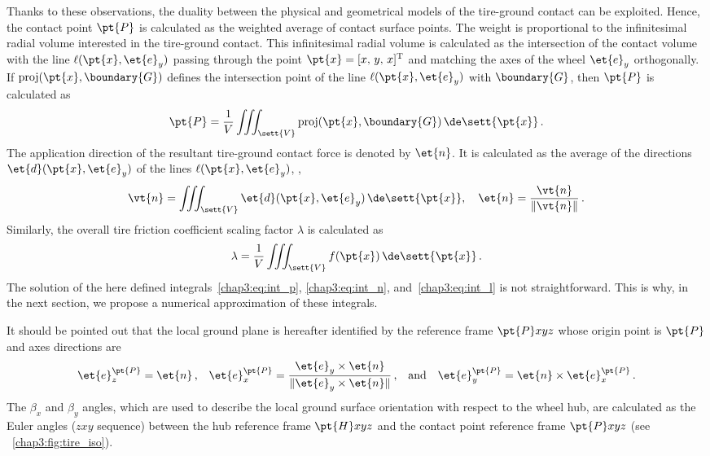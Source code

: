 Thanks to these observations, the duality between the physical and geometrical models of the tire-ground contact can be exploited. Hence, the contact point $\pt{P}$ is calculated as the weighted average of contact surface points. The weight is proportional to the infinitesimal radial volume interested in the tire-ground contact. This infinitesimal radial volume is calculated as the intersection of the contact volume with the line $\ell(\pt{x},\et{e}_y)$ passing through the point $\pt{x} = [x, \, y, \, x]^\mathrm{T}$ and matching the axes of the wheel $\et{e}_y$ orthogonally. If $\mathrm{proj}(\pt{x},\boundary{G})$ defines the intersection point of the line $\ell(\pt{x},\et{e}_y)$ with $\boundary{G}$, then $\pt{P}$ is calculated as
%
\begin{equation}
  \pt{P} = \dfrac{1}{V} \displaystyle\iiint_\sett{V} \mathrm{proj}(\pt{x},\boundary{G}) \, \de\sett{\pt{x}}
  \,\text{.}
  \label{chap3:eq:int_p}
\end{equation}
%
The application direction of the resultant tire-ground contact force is denoted by $\et{n}$. It is calculated as the average of the directions $\et{d}(\pt{x},\et{e}_y)$ of the lines $\ell(\pt{x},\et{e}_y)$, \ie{},
%
\begin{equation}
  \vt{n} = \displaystyle\iiint_\sett{V} \et{d}(\pt{x},\et{e}_y) \, \de\sett{\pt{x}},
  \quad
  \et{n} = \dfrac{\vt{n}}{\|\vt{n}\|}
  \,\text{.}
  \label{chap3:eq:int_n}
\end{equation}
%
Similarly, the overall tire friction coefficient scaling factor $\lambda$ is calculated as
%
\begin{equation}
  \lambda = \dfrac{1}{V} \displaystyle\iiint_\sett{V} f(\pt{x}) \, \de\sett{\pt{x}}
  \,\text{.}
  \label{chap3:eq:int_l}
\end{equation}
%
The solution of the here defined integrals~\eqref{chap3:eq:int_p}, \eqref{chap3:eq:int_n}, and~\eqref{chap3:eq:int_l} is not straightforward. This is why, in the next section, we propose a numerical approximation of these integrals.

It should be pointed out that the local ground plane is hereafter identified by the reference frame $\pt{P}xyz$ whose origin point is $\pt{P}$ and axes directions are
%
\begin{align*}
  \et{e}^\pt{P}_z = \et{n}\,\text{,} \quad
  \et{e}^\pt{P}_x = \dfrac{\et{e}_y \times \et{n}}{\|\et{e}_y \times \et{n}\|}\,\text{,} \quad \text{and} \quad
  \et{e}^\pt{P}_y = \et{n} \times \et{e}^\pt{P}_x
  \,\text{.}
\end{align*}
%
The $\beta_x$ and $\beta_y$ angles, which are used to describe the local ground surface orientation with respect to the wheel hub, are calculated as the Euler angles ($zxy$ sequence) between the hub reference frame $\pt{H}xyz$ and the contact point reference frame $\pt{P}xyz$ (see \figurename{}~\ref{chap3:fig:tire_iso}).

